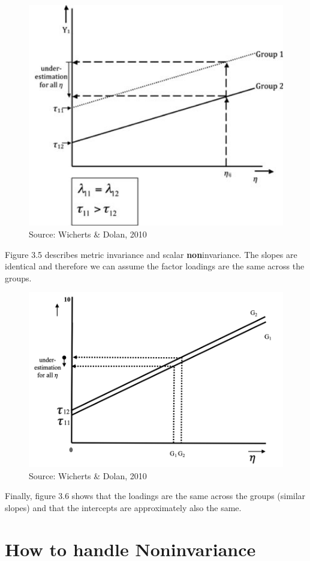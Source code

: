 \documentclass[
]{book}
\begin{document}
\begin{figure}
\includegraphics[width=0.8\linewidth]{Picture1} \caption{Source: Wicherts & Dolan, 2010}\label{fig:metric}
\end{figure}

Figure 3.5 describes metric invariance and scalar \textbf{non}invariance. The slopes are identical and therefore we can assume the factor loadings are the same across the groups.

\begin{figure}
\includegraphics[width=0.8\linewidth]{metric_scalar} \caption{Source: Wicherts & Dolan, 2010}\label{fig:metandscalar}
\end{figure}

Finally, figure 3.6 shows that the loadings are the same across the groups (similar slopes) and that the intercepts are approximately also the same.

\hypertarget{how-to-handle-noninvariance}{%
\section{How to handle Noninvariance}\label{how-to-handle-noninvariance}}
\end{document}
